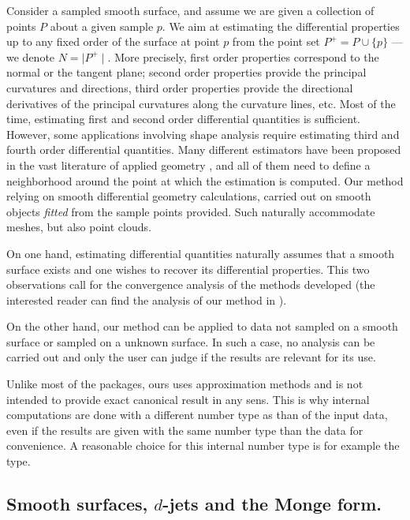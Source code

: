 Consider a sampled smooth surface, and assume we are given a
collection of points $P$ about a given sample $p$. We aim at
estimating the differential properties up to any fixed order of the
surface at point $p$ from the point set $P^+ = P\cup \{ p\}$ --- we
denote $N=\mid P^+\mid$. More precisely, first order properties
correspond to the normal or the tangent plane; second order properties
provide the principal curvatures and directions, third order
properties provide the directional derivatives of the principal
curvatures along the curvature lines, etc.  Most of the time,
estimating first and second order differential quantities is
sufficient.  However, some applications involving shape analysis
require estimating third and fourth order differential quantities.
Many different estimators have been proposed in the vast literature of
applied geometry \cite{cgal:p-smrqt-01}, and all of them need to
define a neighborhood around the point at which the estimation is
computed.  Our method relying on smooth differential geometry
calculations, carried out on smooth objects {\em fitted} from the
sample points provided. Such naturally accommodate meshes, but also
point clouds.


On one hand, estimating differential quantities naturally assumes that
a smooth surface exists and one wishes to recover its differential
properties.
%
This two observations call for the convergence analysis of the methods
developed (the interested reader can find the analysis of our method
in \cite{cgal:cp-edqpf-05}). 

On the other hand, our method can be applied to data not sampled on a
smooth surface or sampled on a unknown surface. In such a case, no
analysis can be carried out and only the user can judge if the results
are relevant for its use.

Unlike most of the \cgal packages, ours uses approximation methods and
is not intended to provide exact canonical result in any sens. This is
why internal computations are done with a different number type as
than of the input data, even if the results are given with the same
number type than the data for convenience. A reasonable choice for
this internal number type is for example the  type.

\subsection{Smooth surfaces, $d$-jets and the Monge form.}

